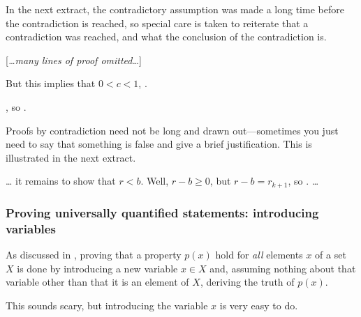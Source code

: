 In the next extract, the contradictory assumption was made a long time before the contradiction is reached, so special care is taken to reiterate that a contradiction was reached, and what the conclusion of the contradiction is.

\begin{extract}
\label{xtrContradictionExampleTwo}

[\textit{\dots{}many lines of proof omitted\dots{}}]

But this implies that $0 < c < 1$, .

, so .
\end{extract}

Proofs by contradiction need not be long and drawn out---sometimes you just need to say that something is false and give a brief justification. This is illustrated in the next extract.

\begin{extract}
\label{xtrContradictionOneLineExample}
\dots{} it remains to show that $r < b$. Well,  $r-b \ge 0$, but $r-b=r_{k+1}$, so .  \dots{}
\end{extract}

\subsubsection*{Proving universally quantified statements: introducing variables}

As discussed in , proving that a property $p(x)$ hold for \textit{all} elements $x$ of a set $X$ is done by introducing a new variable $x \in X$ and, assuming nothing about that variable other than that it is an element of $X$, deriving the truth of $p(x)$.

This sounds scary, but introducing the variable $x$ is very easy to do.

